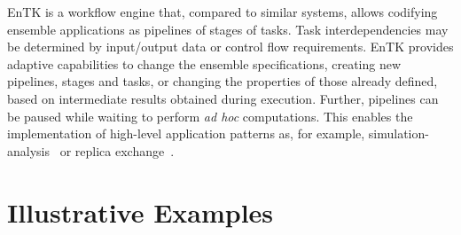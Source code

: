 \documentclass[preprint,12pt, a4paper]{elsarticle}
\begin{document}

EnTK is a workflow engine that, compared to similar systems, allows codifying
ensemble applications as pipelines of stages of tasks. Task interdependencies
may be determined by input/output data or control flow requirements.
%
%
EnTK provides adaptive capabilities to change the ensemble specifications,
creating new pipelines, stages and tasks, or changing the properties of those
already defined, based on intermediate results obtained during execution.
Further, pipelines can be paused while waiting to perform \textit{ad hoc}
computations. This enables the implementation of high-level application
patterns as, for example,
simulation-analysis~\cite{balasubramanian2016extasy} or replica
exchange~\cite{treikalis2016repex}.






\section{Illustrative Examples}\label{sec:examples}

\end{document}
